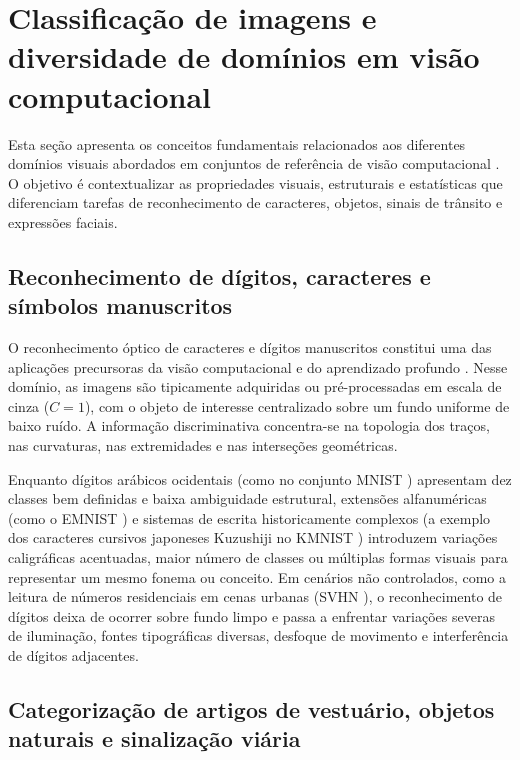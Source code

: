 \documentclass[
    12pt,
    openright,
    oneside,
    a4paper,
    english,
    brazil
]{abntex2}
\begin{document}
\section{Classificação de imagens e diversidade de domínios em visão computacional}

Esta seção apresenta os conceitos fundamentais relacionados aos diferentes domínios visuais abordados em conjuntos de referência de visão computacional \cite{gonzalez2008digital,szeliski2022computer}. O objetivo é contextualizar as propriedades visuais, estruturais e estatísticas que diferenciam tarefas de reconhecimento de caracteres, objetos, sinais de trânsito e expressões faciais.

\subsection{Reconhecimento de dígitos, caracteres e símbolos manuscritos}

O reconhecimento óptico de caracteres e dígitos manuscritos constitui uma das aplicações precursoras da visão computacional e do aprendizado profundo \cite{lecun1998gradient,LeCun2015}. Nesse domínio, as imagens são tipicamente adquiridas ou pré-processadas em escala de cinza (\(C=1\)), com o objeto de interesse centralizado sobre um fundo uniforme de baixo ruído. A informação discriminativa concentra-se na topologia dos traços, nas curvaturas, nas extremidades e nas interseções geométricas.

Enquanto dígitos arábicos ocidentais (como no conjunto MNIST \cite{lecun1998gradient}) apresentam dez classes bem definidas e baixa ambiguidade estrutural, extensões alfanuméricas (como o EMNIST \cite{cohen2017emnist}) e sistemas de escrita historicamente complexos (a exemplo dos caracteres cursivos japoneses Kuzushiji no KMNIST \cite{clanuwat2018kmnist}) introduzem variações caligráficas acentuadas, maior número de classes ou múltiplas formas visuais para representar um mesmo fonema ou conceito. Em cenários não controlados, como a leitura de números residenciais em cenas urbanas (SVHN \cite{netzer2011svhn}), o reconhecimento de dígitos deixa de ocorrer sobre fundo limpo e passa a enfrentar variações severas de iluminação, fontes tipográficas diversas, desfoque de movimento e interferência de dígitos adjacentes.

\subsection{Categorização de artigos de vestuário, objetos naturais e sinalização viária}
\end{document}
